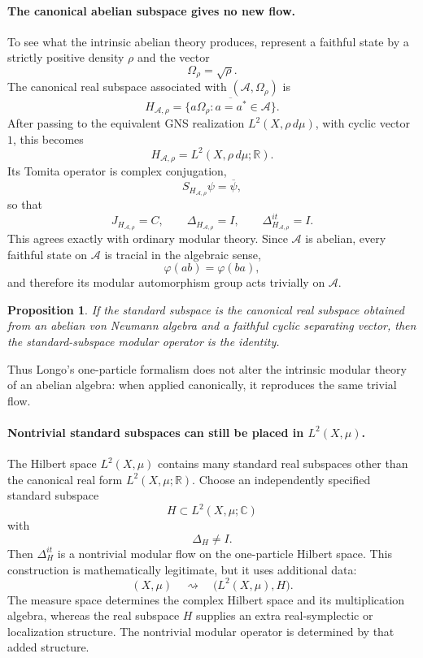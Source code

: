 \documentclass[a4paper,11pt]{article}
\newtheorem{proposition}[theorem]{Proposition}
\theoremstyle{definition}
\begin{document}
\paragraph{The canonical abelian subspace gives no new flow.}
To see what the intrinsic abelian theory produces, represent a faithful state by a strictly positive density \(\rho\) and the vector
\[
    \Omega_\rho=\sqrt{\rho}.
\]
The canonical real subspace associated with \((\mathcal{A},\Omega_\rho)\) is
\[
    H_{\mathcal{A},\rho}
    =\overline{\{a\Omega_\rho:a=a^*\in\mathcal{A}\}}.
\]
After passing to the equivalent GNS realization \(L^2(X,\rho\,d\mu)\), with cyclic vector \(1\), this becomes
\[
    H_{\mathcal{A},\rho}=L^2(X,\rho\,d\mu;\mathbb{R}).
\]
Its Tomita operator is complex conjugation,
\[
    S_{H_{\mathcal{A},\rho}}\psi=\overline{\psi},
\]
so that
\[
    J_{H_{\mathcal{A},\rho}}=C,
    \qquad
    \Delta_{H_{\mathcal{A},\rho}}=I,
    \qquad
    \Delta_{H_{\mathcal{A},\rho}}^{it}=I.
\]
This agrees exactly with ordinary modular theory. Since \(\mathcal{A}\) is abelian, every faithful state on \(\mathcal{A}\) is tracial in the algebraic sense,
\[
    \varphi(ab)=\varphi(ba),
\]
and therefore its modular automorphism group acts trivially on \(\mathcal{A}\).

\begin{proposition}
If the standard subspace is the canonical real subspace obtained from an abelian von Neumann algebra and a faithful cyclic separating vector, then the standard-subspace modular operator is the identity.
\end{proposition}

Thus Longo's one-particle formalism does not alter the intrinsic modular theory of an abelian algebra: when applied canonically, it reproduces the same trivial flow.

\paragraph{Nontrivial standard subspaces can still be placed in \(L^2(X,\mu)\).}
The Hilbert space \(L^2(X,\mu)\) contains many standard real subspaces other than the canonical real form \(L^2(X,\mu;\mathbb{R})\). Choose an independently specified standard subspace
\[
    H\subset L^2(X,\mu;\mathbb{C})
\]
with
\[
    \Delta_H\neq I.
\]
Then \(\Delta_H^{it}\) is a nontrivial modular flow on the one-particle Hilbert space. This construction is mathematically legitimate, but it uses additional data:
\[
    (X,\mu)
    \quad\rightsquigarrow\quad
    \bigl(L^2(X,\mu),H\bigr).
\]
The measure space determines the complex Hilbert space and its multiplication algebra, whereas the real subspace \(H\) supplies an extra real-symplectic or localization structure. The nontrivial modular operator is determined by that added structure.
\end{document}
